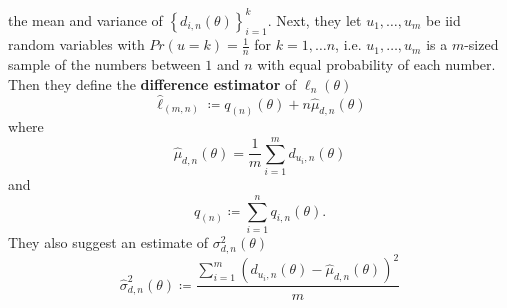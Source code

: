 the mean and variance of $\left\{d_{i,n}\left(\theta\right)\right\}_{i=1}^k$. Next, they let $u_1, \ldots, u_m$ be iid random variables with $Pr\left(u = k\right) = \frac{1}{n}$ for $k = 1, \ldots n$, i.e. $u_1, \ldots, u_m$ is a $m$-sized sample of the numbers between $1$ and $n$ with equal probability of each number.  
Then they define the \textbf{difference estimator} of $\ell_n\left(\theta\right)$
\begin{equation}
    \hat{\ell}_{\left(m,n\right)}\coloneqq q_{\left(n\right)}\left(\theta\right) + n\hat{\mu}_{d,n}\left(\theta\right) 
\end{equation}
where 
\begin{equation*}
    \hat{\mu}_{d,n}\left(\theta\right) = \frac{1}{m}\sum_{i=1}^m d_{u_i,n}\left(\theta\right)
\end{equation*}{}
and 
\begin{equation*}
    q_{\left(n\right)} \coloneqq \sum_{i=1}^n q_{i,n}\left(\theta\right).
\end{equation*}
They also suggest an estimate of $\sigma_{d,n}^2\left(\theta\right)$
\begin{equation}
    \hat{\sigma}_{d,n}^2\left(\theta\right) \coloneqq \frac{\sum_{i = 1}^m \left(d_{u_i, n}\left(\theta\right) - \hat{\mu}_{d,n}\left(\theta\right)\right)^2}{m} 
\end{equation}

